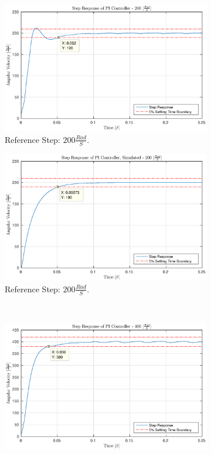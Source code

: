 \begin{figure}[!h]
	\begin{subfigure}[t]{.49\linewidth}
		\centering
		\includegraphics[width=\textwidth]{graphics/step_200_pi_real}
		\caption{Reference Step: $200 \frac{Rad}{S}$.}
		\label{fig:step200}
	\end{subfigure}
	\begin{subfigure}[t]{.49\linewidth}
		\includegraphics[width=\textwidth]{graphics/step_200_pi_simulated}
		\caption{Reference Step: $200 \frac{Rad}{S}$.}
		\label{fig:step200simulated}
	\end{subfigure}\\
	\centering
	\begin{subfigure}[t]{.49\linewidth}
		\centering
		\includegraphics[width=\textwidth]{graphics/step_400_pi}

\end{subfigure}
\end{figure}
